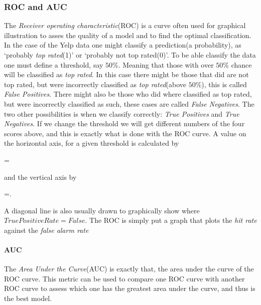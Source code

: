 \subsubsection{ROC and AUC}\label{ROC and AUC}
The \textit{Receiver operating characteristic}(ROC)\cite{Project2} is a curve often used for graphical illustration to asses the quality of a model and to find the optimal classification. In the case of the Yelp data one might classify a prediction(a probability), as `probably \textit{top rated}(1)' or `probably not top rated(0)'. To be able classify the data one must define a threshold, say $50\%$. Meaning that those with over $50\%$ chance will be classified as \textit{top rated}. In this case there might be those that did are not top rated, but were incorrectly classified as \textit{top rated}(above $50\%$), this is called \textit{False Positives}. There might also be those who did where classified as top rated, but were incorrectly classified as such, these cases are called \textit{False Negatives}. The two other possibilities is when we classify correctly: \textit{True Positives} and \textit{True Negatives}. If we change the threshold we will get different numbers of the four scores above, and this is exactly what is done with the ROC curve. A value on the horizontal axis, for a given threshold is calculated by
\begin{gather+}[0.9]
     =
\end{gather+}
and the vertical axis by
\begin{gather+}[0.9]
=.
\end{gather+}
A diagonal line is also usually drawn to graphically show where $True Positive Rate = False$.
The ROC is simply put a graph that plots the \textit{hit rate} against the \textit{false alarm rate}

\paragraph{AUC}
The \textit{Area Under the Curve}(AUC) is exactly that, the area under the curve of the ROC curve. This metric can be used to compare one ROC curve with another ROC curve to assess which one has the greatest area under the curve, and thus is the best model.


